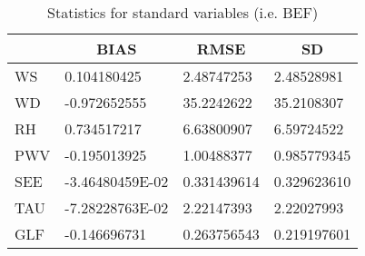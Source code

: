 \documentclass[11pt,english]{article}
\begin{document}
\begin{table}[]
\begin{center}
\begin{tabular}{|l|l|l|l|}
\hline
                            & \multicolumn{1}{c|}{\cellcolor[HTML]{C0C0C0}\textbf{BIAS}} & \multicolumn{1}{c|}{\cellcolor[HTML]{C0C0C0}\textbf{RMSE}} & \multicolumn{1}{c|}{\cellcolor[HTML]{C0C0C0}\textbf{SD}} \\\hline
\cellcolor[HTML]{C0C0C0}WS  &   0.104180425                                    &    2.48747253                                    &    2.48528981                                    \\
\cellcolor[HTML]{C0C0C0}WD  &  -0.972652555                                    &    35.2242622                                    &    35.2108307                                    \\
\cellcolor[HTML]{C0C0C0}RH  &   0.734517217                                    &    6.63800907                                    &    6.59724522                                    \\
\cellcolor[HTML]{C0C0C0}PWV &  -0.195013925                                   &    1.00488377                                   &   0.985779345                                   \\
\cellcolor[HTML]{C0C0C0}SEE &   -3.46480459E-02                               &   0.331439614                                   &   0.329623610                                   \\
\cellcolor[HTML]{C0C0C0}TAU &   -7.28228763E-02                               &    2.22147393                                   &    2.22027993                                   \\
\cellcolor[HTML]{C0C0C0}GLF &  -0.146696731                                   &   0.263756543                                   &   0.219197601                                   \\
\hline
\end{tabular}
\caption{Statistics for standard variables (i.e. BEF)}
\end{center}
\end{table}
\newpage
\end{document}
